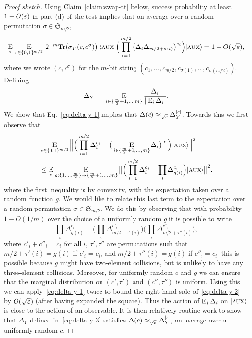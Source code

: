 \begin{proof}[Proof sketch]
Using Claim~\ref{claim:swap-tt} below, success probability at least $1-O(\varepsilon)$ in part (d) of the test implies that on average over a random permutation $\sigma \in \mathfrak{S}_{m/2}$, 
\begin{equation}\label{eq:delta-y-1}
 \mathop{\textsc{E}}_{\sigma} \,\mathop{\textsc{E}}_{c\in\{0,1\}^{m/2}}\,2^{-m}\mbox{\rm Tr} \big(\sigma_Y(c,c^\sigma)\big)\,\langle\textsc {aux}| \Big( \prod_{i=1}^{m/2}\big( \Delta_i \Delta_{m/2+ \sigma(i)} \big)^{c_i} \Big) |\textsc {aux}\rangle  = 1- O(\sqrt{\varepsilon}),
\end{equation}
where we wrote $(c,c^\sigma)$ for the $m$-bit string $(c_1,\ldots,c_{m/2},c_{\sigma(1)},\ldots,c_{\sigma(m/2)})$. Defining
 \begin{equation}\label{eq:delta-y-3}
\Delta_Y \,=\, \mathop{\textsc{E}}_{i\in\{\frac{m}{2}+1,\ldots,m\}} \frac{\Delta_i}{|\mathop{\textsc{E}}_{i} \Delta_i|},
\end{equation}
We show that Eq.~\eqref{eq:delta-y-1} implies that $\Delta(c) \approx_{\sqrt{\varepsilon}} \Delta_Y^{|c|}$. Towards this we first observe that
\begin{align}
  &\mathop{\textsc{E}}_{c\in\{0,1\}^{m/2}} \Big\| \Big(\prod_{i=1}^{m/2} \Delta_i^{c_i} -
  \big(\mathop{\textsc{E}}_{i\in\{\frac{m}{2}+1,\ldots,m\}} \Delta_{i}\big)^{|c|}\Big) |\textsc {aux}\rangle
  \Big\|^2\\&\leq 
\mathop{\textsc{E}}_{c} \mathop{\textsc{E}}_{g:\{1,\ldots,\frac{m}{2}\}\to\{\frac{m}{2}+1,\ldots,m\}} \big\|\Big(\prod_{i=1}^{m/2} \Delta_i^{c_i} - \prod_i \Delta_{g(i)}^{c_i}\Big) |\textsc {aux}\rangle \big\|^2.\label{eq:delta-y-2}
\end{align}
where the first inequality is by convexity, with the expectation taken over a random function $g$. We would like to relate this last term to the expectation over a random permutation $\sigma\in\mathfrak{S}_{m/2}$. We do this by observing that with  probability $1-O(1/m)$ over the choice of a uniformly random $g$ it is possible to write
$$ \prod_i \Delta_{g(i)}^{c_i} = \Big(\prod_i \Delta_{m/2+\tau'(i)}^{c'_i}\Big)\Big(\prod_i \Delta_{m/2+\tau''(i)}^{c''_i}\Big),$$
where $c'_i+c''_i=c_i$ for all $i$, $\tau',\tau''$ are permutations such that $m/2+\tau'(i)=g(i)$ if $c'_i=c_i$, and $m/2+\tau''(i)=g(i)$ if $c''_i=c_i$; this is possible because $g$ might have two-element collisions, but is unlikely to have any three-element collisions. Moreover, for uniformly random $c$ and $g$ we can ensure that the marginal distribution on $(c',\tau')$ and $(c'',\tau'')$ is uniform.  Using this we can apply~\eqref{eq:delta-y-1} twice to bound the right-hand side of~\eqref{eq:delta-y-2} by $O(\sqrt{\varepsilon})$ (after having expanded the square). Thus the action of $\mathop{\textsc{E}}_{i}\Delta_i$ on $|\textsc {aux}\rangle$ is close to the action of an observable. It is then relatively routine work to show that $\Delta_Y$ defined in~\eqref{eq:delta-y-3} satisfies $\Delta(c) \approx_{\sqrt{\varepsilon}} \Delta_Y^{|c|}$, on average over a uniformly random $c$. 


\end{proof}

